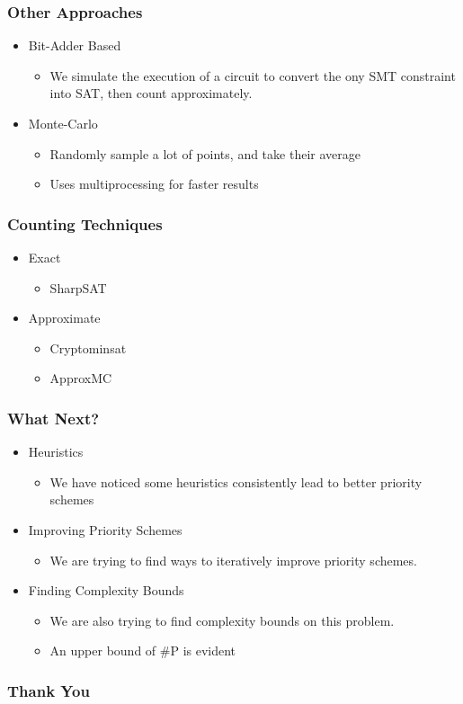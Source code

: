 \documentclass{beamer}
\begin{document}
\begin{frame}
\frametitle{Other Approaches}
	\begin{itemize}
	\item Bit-Adder Based
		\begin{itemize}
		\item We simulate the execution of a circuit to convert the ony SMT constraint into SAT, then count approximately.
		\end{itemize}
	
	\item Monte-Carlo
		\begin{itemize}
		\item Randomly sample a lot of points, and take their average
		\item Uses multiprocessing for faster results
		\end{itemize}
	\end{itemize}
\end{frame}



\begin{frame}
\frametitle{Counting Techniques}
\begin{itemize}
\item Exact
	\begin{itemize}
	\item SharpSAT
	\end{itemize}

\item Approximate
	\begin{itemize}
	\item Cryptominsat
	\item ApproxMC
	\end{itemize}
\end{itemize}
\end{frame}

\begin{frame}
\frametitle{What Next?}
	\begin{itemize}
	\item Heuristics
		\begin{itemize}
		\item We have noticed some heuristics consistently lead to better priority schemes
		\end{itemize}
	\item Improving Priority Schemes
		\begin{itemize}
		\item We are trying to find ways to iteratively improve priority schemes.
		\end{itemize}
	\item Finding Complexity Bounds
		\begin{itemize}
		\item We are also trying to find complexity bounds on this problem.
		\item An upper bound of \#P is evident
		\end{itemize}
	\end{itemize}
\end{frame}


\begin{frame}
\frametitle{Thank You}
\end{frame}
\end{document}
